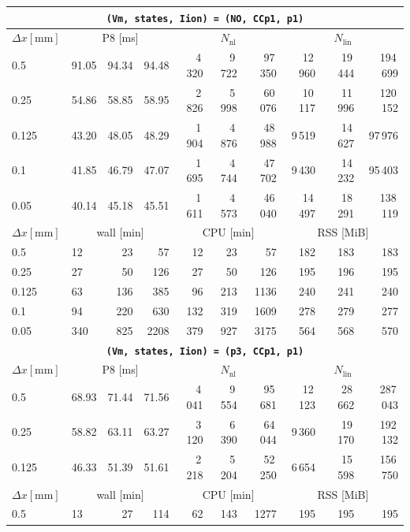 \documentclass[11pt,a4paper]{article}
\newcommand{\code}[1]{\texttt{\small #1}}
\begin{document}
\begin{center}
\begin{longtable}{l|lrr|rrr|rrr}
\hline
\hline
\multicolumn{10}{c}{\textbf{\code{(Vm, states, Iion) = (NO, CCp1, p1)}}}\\\hline
$ \Delta x [\text{mm}] $ & \multicolumn{3}{c|}{P8 [ms]} & \multicolumn{3}{c|}{$N_{\mathrm{nl}}$} & \multicolumn{3}{c|}{$N_{\mathrm{lin}}$}\\
0.5 & 91.05 & 94.34 & 94.48 & 4\,320 & 9\,722 & 97\,350 & 12\,960 & 19\,444 & 194\,699\\
0.25 & 54.86 & 58.85 & 58.95 & 2\,826 & 5\,998 & 60\,076 & 10\,117 & 11\,996 & 120\,152\\
0.125 & 43.20 & 48.05 & 48.29 & 1\,904 & 4\,876 & 48\,988 & 9\,519 & 14\,627 & 97\,976\\
0.1 & 41.85 & 46.79 & 47.07 & 1\,695 & 4\,744 & 47\,702 & 9\,430 & 14\,232 & 95\,403\\
0.05 & 40.14 & 45.18 & 45.51 & 1\,611 & 4\,573 & 46\,040 & 14\,497 & 18\,291 & 138\,119\\
\hline
$ \Delta x [\text{mm}] $ & \multicolumn{3}{c|}{wall [min]} & \multicolumn{3}{c|}{CPU [min]} & \multicolumn{3}{c|}{RSS [MiB]}\\
0.5 & 12 & 23 & 57 & 12 & 23 & 57 & 182 & 183 & 183\\
0.25 & 27 & 50 & 126 & 27 & 50 & 126 & 195 & 196 & 195\\
0.125 & 63 & 136 & 385 & 96 & 213 & 1136 & 240 & 241 & 240\\
0.1 & 94 & 220 & 630 & 132 & 319 & 1609 & 278 & 279 & 277\\
0.05 & 340 & 825 & 2208 & 379 & 927 & 3175 & 564 & 568 & 570\\
\hline
\hline
\multicolumn{10}{c}{\textbf{\code{(Vm, states, Iion) = (p3, CCp1, p1)}}}\\\hline
$ \Delta x [\text{mm}] $ & \multicolumn{3}{c|}{P8 [ms]} & \multicolumn{3}{c|}{$N_{\mathrm{nl}}$} & \multicolumn{3}{c|}{$N_{\mathrm{lin}}$}\\
0.5 & 68.93 & 71.44 & 71.56 & 4\,041 & 9\,554 & 95\,681 & 12\,123 & 28\,662 & 287\,043\\
0.25 & 58.82 & 63.11 & 63.27 & 3\,120 & 6\,390 & 64\,044 & 9\,360 & 19\,170 & 192\,132\\
0.125 & 46.33 & 51.39 & 51.61 & 2\,218 & 5\,204 & 52\,250 & 6\,654 & 15\,598 & 156\,750\\
\hline
$ \Delta x [\text{mm}] $ & \multicolumn{3}{c|}{wall [min]} & \multicolumn{3}{c|}{CPU [min]} & \multicolumn{3}{c|}{RSS [MiB]}\\
0.5 & 13 & 27 & 114 & 62 & 143 & 1277 & 195 & 195 & 195\\

\end{longtable}
\end{center}
\end{document}
